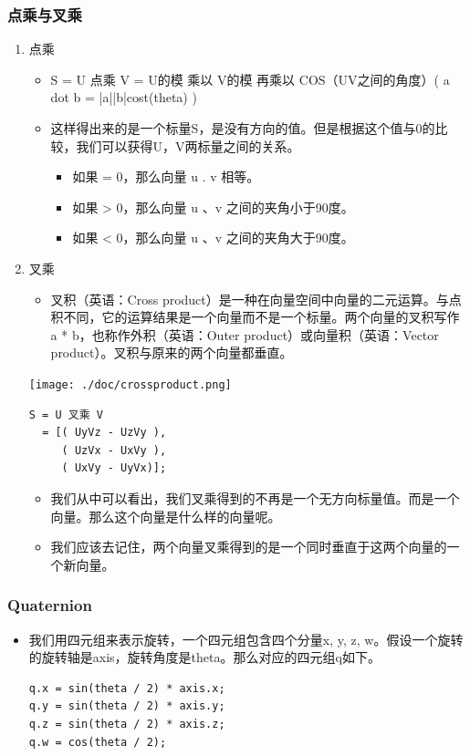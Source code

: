 \documentclass[9pt, b5paper]{article}
\begin{document}
\subsubsection{点乘与叉乘}
\label{sec:org64d7c6c}
\begin{enumerate}
\item 点乘
\label{sec:org9370e30}
\begin{itemize}
\item S = U 点乘 V = U的模 乘以 V的模 再乘以 COS（UV之间的角度）( a dot b = |a||b|cost(theta) )
\item 这样得出来的是一个标量S，是没有方向的值。但是根据这个值与0的比较，我们可以获得U，V两标量之间的关系。
\begin{itemize}
\item 如果 = 0，那么向量 u . v 相等。
\item 如果 > 0，那么向量 u 、v 之间的夹角小于90度。
\item 如果 < 0，那么向量 u 、v 之间的夹角大于90度。
\end{itemize}
\end{itemize}

\item 叉乘
\label{sec:org8d65826}
\begin{itemize}
\item 叉积（英语：Cross product）是一种在向量空间中向量的二元运算。与点积不同，它的运算结果是一个向量而不是一个标量。两个向量的叉积写作 a * b，也称作外积（英语：Outer product）或向量积（英语：Vector product）。叉积与原来的两个向量都垂直。
\end{itemize}

\begin{center}
\texttt{[image: ./doc/crossproduct.png]}
\end{center}

\begin{verbatim}
S = U 叉乘 V 
  = [( UyVz - UzVy ),
     ( UzVx - UxVy ),
     ( UxVy - UyVx)];
\end{verbatim}
\begin{itemize}
\item 我们从中可以看出，我们叉乘得到的不再是一个无方向标量值。而是一个向量。那么这个向量是什么样的向量呢。
\item 我们应该去记住，两个向量叉乘得到的是一个同时垂直于这两个向量的一个新向量。
\end{itemize}
\end{enumerate}

\subsubsection{Quaternion}
\label{sec:org0d4f761}
\begin{itemize}
\item 我们用四元组来表示旋转，一个四元组包含四个分量x, y, z, w。假设一个旋转的旋转轴是axis，旋转角度是theta。那么对应的四元组q如下。
\begin{verbatim}
q.x = sin(theta / 2) * axis.x;
q.y = sin(theta / 2) * axis.y;
q.z = sin(theta / 2) * axis.z;
q.w = cos(theta / 2);
\end{verbatim}
\end{itemize}
\end{document}
